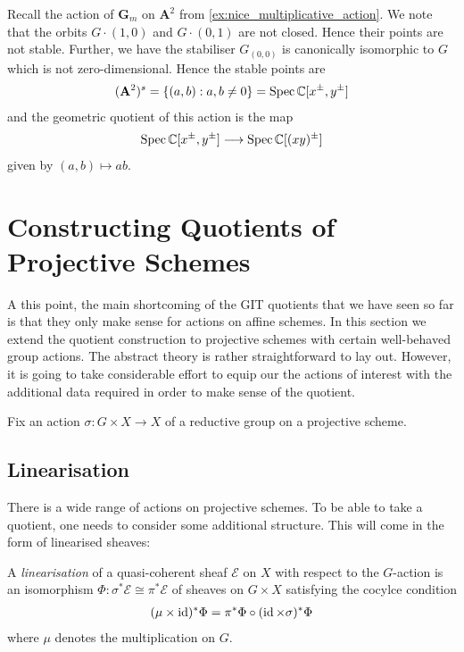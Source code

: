 \documentclass[12pt]{ociamthesis}  %
\begin{document}
\begin{example}
  Recall the action of $\mathbf G_m$ on $\mathbf A^2$ from
  \ref{ex:nice_multiplicative_action}. We note that the orbits
  $G\cdot(1,0)$ and $G\cdot(0,1)$ are not closed. Hence their points
  are not stable. Further, we have the stabiliser $G_{(0,0)}$
  is canonically isomorphic to $G$ which is not zero-dimensional.
  Hence the stable points are
  \begin{align*}
    (\mathbf A^2)^s = \{(a,b):a,b\neq 0\} = \operatorname{Spec} \mathbb C[x^\pm,y^\pm]
  \end{align*}
  and the geometric quotient of this action is the map
  \begin{align*}
    \operatorname{Spec}\mathbb C[x^\pm,y^\pm]\longrightarrow\operatorname{Spec}\mathbb C[(xy)^\pm]
  \end{align*}
  given by $(a,b)\mapsto ab$.
\end{example}

\section{Constructing Quotients of Projective Schemes}

A this point, the main shortcoming of the GIT quotients that
we have seen so far is that they only make sense for actions on
affine schemes. In this section we extend the quotient construction
to projective schemes with certain well-behaved group actions.
The abstract theory is rather straightforward to lay out. However,
it is going to take considerable effort to equip our the actions of interest
with the additional data required in order to make sense of the quotient.

Fix an action $\sigma : G\times X\to X$ of a reductive
group on a projective scheme.

\subsection{Linearisation}

There is a wide range of actions on projective schemes. To be able to
take a quotient, one needs to consider some additional structure. This
will come in the form of linearised sheaves:

\begin{definition}
  A \emph{linearisation} of a quasi-coherent sheaf
  $\mathscr E$ on $X$ with respect to the $G$-action
  is an isomorphism $\Phi : \sigma^*\mathscr E \cong\pi^*\mathscr E$
  of sheaves on $G\times X$ satisfying the cocylce condition
  \begin{align}\label{eq:cocyle_condition}
    (\mu \times \operatorname{id})^*\Phi = \pi^*\Phi \circ (\operatorname{id}\times\sigma)^*\Phi
  \end{align}
  where $\mu$ denotes the multiplication on $G$.
\end{definition}
\end{document}
